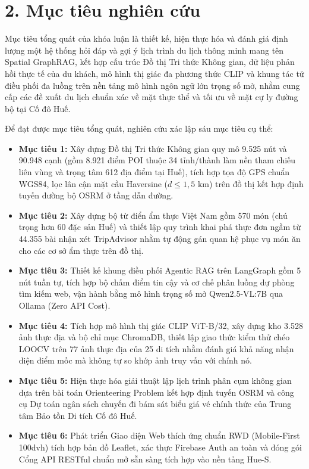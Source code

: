 \section*{2. Mục tiêu nghiên cứu}
{}

Mục tiêu tổng quát của khóa luận là thiết kế, hiện thực hóa và đánh giá định lượng một hệ thống hỏi đáp và gợi ý lịch trình du lịch thông minh mang tên Spatial GraphRAG, kết hợp cấu trúc Đồ thị Tri thức Không gian, dữ liệu phản hồi thực tế của du khách, mô hình thị giác đa phương thức CLIP và khung tác tử điều phối đa luồng trên nền tảng mô hình ngôn ngữ lớn trọng số mở, nhằm cung cấp các đề xuất du lịch chuẩn xác về mặt thực thể và tối ưu về mặt cự ly đường bộ tại Cố đô Huế.

Để đạt được mục tiêu tổng quát, nghiên cứu xác lập sáu mục tiêu cụ thể:
\begin{itemize}
    \item \textbf{Mục tiêu 1:} Xây dựng Đồ thị Tri thức Không gian quy mô 9.525 nút và 90.948 cạnh (gồm 8.921 điểm POI thuộc 34 tỉnh/thành làm nền tham chiếu liên vùng và trọng tâm 612 địa điểm tại Huế), tích hợp tọa độ GPS chuẩn WGS84, lọc lân cận mặt cầu Haversine ($d \le 1{,}5\text{ km}$) trên đồ thị kết hợp định tuyến đường bộ OSRM ở tầng dẫn đường.
    \item \textbf{Mục tiêu 2:} Xây dựng bộ từ điển ẩm thực Việt Nam gồm 570 món (chú trọng hơn 60 đặc sản Huế) và thiết lập quy trình khai phá thực đơn ngầm từ 44.355 bài nhận xét TripAdvisor nhằm tự động gán quan hệ phục vụ món ăn cho các cơ sở ẩm thực trên đồ thị.
    \item \textbf{Mục tiêu 3:} Thiết kế khung điều phối Agentic RAG trên LangGraph gồm 5 nút tuần tự, tích hợp bộ chấm điểm tin cậy và cơ chế phân luồng dự phòng tìm kiếm web, vận hành bằng mô hình trọng số mở Qwen2.5-VL:7B qua Ollama (Zero API Cost).
    \item \textbf{Mục tiêu 4:} Tích hợp mô hình thị giác CLIP ViT-B/32, xây dựng kho 3.528 ảnh thực địa và bộ chỉ mục ChromaDB, thiết lập giao thức kiểm thử chéo LOOCV trên 77 ảnh thực địa của 25 di tích nhằm đánh giá khả năng nhận diện điểm mốc mà không tự so khớp ảnh truy vấn với chính nó.
    \item \textbf{Mục tiêu 5:} Hiện thực hóa giải thuật lập lịch trình phân cụm không gian dựa trên bài toán Orienteering Problem kết hợp định tuyến OSRM và công cụ Dự toán ngân sách chuyến đi bám sát biểu giá vé chính thức của Trung tâm Bảo tồn Di tích Cố đô Huế.
    \item \textbf{Mục tiêu 6:} Phát triển Giao diện Web thích ứng chuẩn RWD (Mobile-First 100dvh) tích hợp bản đồ Leaflet, xác thực Firebase Auth an toàn và đóng gói Cổng API RESTful chuẩn mở sẵn sàng tích hợp vào nền tảng Hue-S.
\end{itemize}

